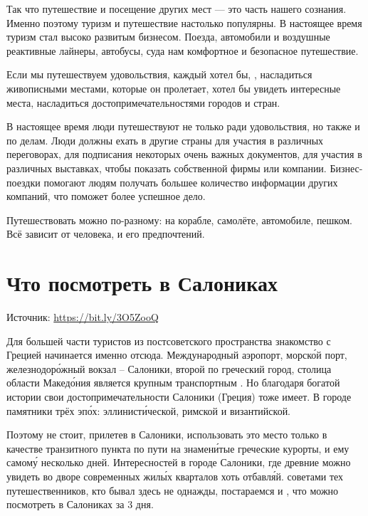 Так что путешествие и посещение других мест --- это часть нашего сознания. Именно поэтому туризм и путешествие настолько популярны. В настоящее время туризм стал высоко развитым бизнесом. Поезда, автомобили и воздушные реактивные лайнеры, автобусы, суда  нам комфортное и безопасное путешествие.

Если мы путешествуем  удовольствия, каждый хотел бы, , насладиться живописными местами, которые он пролетает, хотел бы увидеть интересные места, насладиться достопримечательностями городов и стран.

В настоящее время люди путешествуют не только ради удовольствия, но также и по делам. Люди должны ехать в другие страны для участия в различных переговорах, для подписания некоторых очень важных документов, для участия в различных выставках, чтобы показать  собственной фирмы или компании. Бизнес-поездки помогают людям получать большее количество информации   других компаний, что поможет  более успешное дело.

Путешествовать можно по-разному: на корабле, самолёте, автомобиле, пешком. Всё зависит от человека, и его предпочтений.


\newpage
\section{Что посмотреть в Салониках}
Источник: \url{https://bit.ly/3O5ZooQ}

Для большей части туристов из постсоветского пространства знакомство с Грецией начинается именно отсюда. Международный аэропорт, морск\'{о}й порт, железнодор\'{о}жный вокзал -- Салоники, второй по  греческий город, столица области Макед\'{о}ния является крупным транспортным . Но благодаря богатой истории свои достопримечательности Салоники (Греция) тоже имеет. В городе  памятники трёх эп\'{о}х: эллинист\'{и}ческой, римской и византийской.

Поэтому не стоит, прилетев в Салоники, использовать это место только в качестве транзитного пункта по пути на знамен\'{и}тые греческие курорты,  и ему самом\'{у} несколько дней. Интересностей в городе Салоники, где древние  можно увидеть во дворе современных жил\'{ы}х кварталов хоть отбавл\'{я}й.  советами тех путешественников, кто бывал здесь не однажды, постараемся  и , что можно посмотреть в Салониках за 3 дня.

